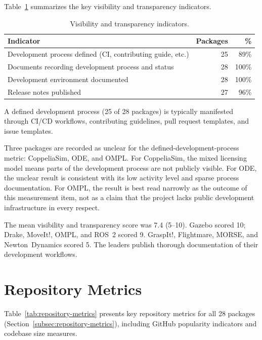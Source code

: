 Table~\ref{tab:visibility-summary} summarizes the key visibility and transparency indicators.

\begin{table}[H]
\centering
\caption{Visibility and transparency indicators.}
\label{tab:visibility-summary}
\begin{tabular}{@{}lrr@{}}
\toprule
\textbf{Indicator} & \textbf{Packages} & \textbf{\%} \\
\midrule
Development process defined (CI, contributing guide, etc.) & 25 & 89\% \\
Documents recording development process and status & 28 & 100\% \\
Development environment documented & 28 & 100\% \\
Release notes published & 27 & 96\% \\
\bottomrule
\end{tabular}
\end{table}

A defined development process (25 of 28 packages) is typically manifested through CI/CD workflows, contributing guidelines, pull request templates, and issue templates.

Three packages are recorded as unclear for the defined-development-process metric: CoppeliaSim, ODE, and OMPL. For CoppeliaSim, the mixed licensing model means parts of the development process are not publicly visible. For ODE, the unclear result is consistent with its low activity level and sparse process documentation. For OMPL, the result is best read narrowly as the outcome of this measurement item, not as a claim that the project lacks public development infrastructure in every respect.

The mean visibility and transparency score was 7.4 (5--10). Gazebo scored 10; Drake, MoveIt!, OMPL, and ROS~2 scored 9. GraspIt!, Flightmare, MORSE, and Newton~Dynamics scored 5. The leaders publish thorough documentation of their development workflows.

\section{Repository Metrics}
\label{sec:repository-metrics-results}

Table~\ref{tab:repository-metrics} presents key repository metrics for all 28 packages (Section~\ref{subsec:repository-metrics}), including GitHub popularity indicators and codebase size measures.

